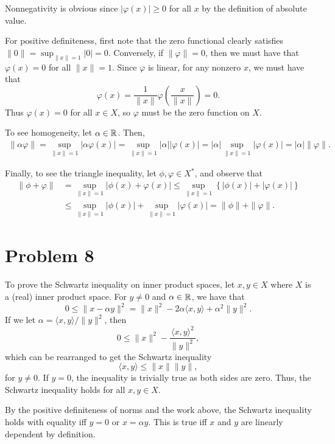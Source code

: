 \documentclass{article}
\begin{document}
Nonnegativity is obvious since $|\varphi(x)|\geq0$ for all $x$ by the definition of absolute value. 

For positive definiteness, first note that the zero functional clearly satisfies $\|0\|=\sup_{\|x\|=1}|0|=0$. Conversely, if $\|\varphi\|=0$, then we must have that $\varphi(x)=0$ for all $\|x\|=1$. Since $\varphi$ is linear, for any nonzero $x$, we must have that 
\[
\varphi(x)=\frac{1}{\|x\|}\varphi\left(\frac{x}{\|x\|}\right)=0.
\]
Thus $\varphi(x)=0$ for all $x\in X$, so $\varphi$ must be the zero function on $X$.

To see homogeneity, let $\alpha\in\mathbb{R}$. Then,
\begin{align*}
\|\alpha\varphi\|=\sup_{\|x\|=1} |\alpha\varphi(x)|=\sup_{\|x\|=1} |\alpha||\varphi(x)|=|\alpha|\sup_{\|x\|=1} |\varphi(x)|=|\alpha|\|\varphi\|.
\end{align*}

Finally, to see the triangle inequality, let $\phi,\varphi\in X^*$, and observe that
\begin{align*}
\|\phi+\varphi\|&=\sup_{\|x\|=1}|\phi(x)+\varphi(x)|\leq\sup_{\|x\|=1}\left\{|\phi(x)|+|\varphi(x)|\right\}\\&\leq
\sup_{\|x\|=1}|\phi(x)|+\sup_{\|x\|=1}|\varphi(x)|=\|\phi\|+\|\varphi\|.
\end{align*}

\section{Problem 8}
To prove the Schwartz inequality on inner product spaces, let $x,y\in X$ where $X$ is a (real) inner product space. For $y\neq0$ and $\alpha\in\mathbb{R}$, we have that
\[
0\leq\|x-\alpha y\|^2=\|x\|^2-2\alpha\langle x,y\rangle+\alpha^2\|y\|^2.
\]
If we let $\alpha=\langle x,y\rangle/\|y\|^2$, then
\[
0\leq\|x\|^2-\frac{\langle x,y\rangle^2}{\|y\|^2},
\]
which can be rearranged to get the Schwartz inequality
\[
\langle x,y\rangle\leq\|x\|\|y\|,
\]
for $y\neq0$. If $y=0$, the inequality is trivially true as both sides are zero. Thus, the Schwartz inequality holds for all $x,y\in X$.

By the positive definiteness of norms and the work above, the Schwartz inequality holds with equality iff $y=0$ or $x=\alpha y$. This is true iff $x$ and $y$ are linearly dependent by definition. 
\end{document}
